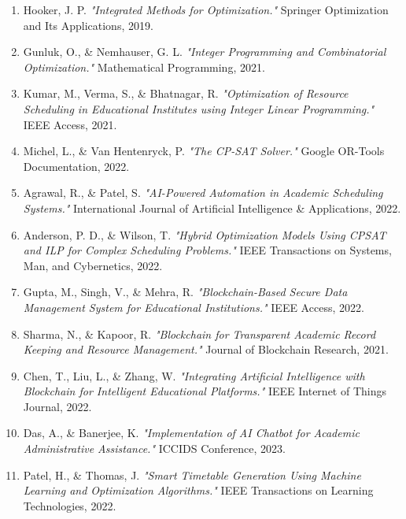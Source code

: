 \documentclass[a4paper, 12pt]{report}
\begin{document}
\begin{enumerate}
\renewcommand{\labelenumi}{[\arabic{enumi}]}

    \item Hooker, J. P. \textit{"Integrated Methods for Optimization."} Springer Optimization and Its Applications, 2019.
    
    \item Gunluk, O., \& Nemhauser, G. L. \textit{"Integer Programming and Combinatorial Optimization."} Mathematical Programming, 2021.
    
    \item Kumar, M., Verma, S., \& Bhatnagar, R. \textit{"Optimization of Resource Scheduling in Educational Institutes using Integer Linear Programming."} IEEE Access, 2021.
    
    \item Michel, L., \& Van Hentenryck, P. \textit{"The CP-SAT Solver."} Google OR-Tools Documentation, 2022.
    
    \item Agrawal, R., \& Patel, S. \textit{"AI-Powered Automation in Academic Scheduling Systems."} International Journal of Artificial Intelligence \& Applications, 2022.
    
    \item Anderson, P. D., \& Wilson, T. \textit{"Hybrid Optimization Models Using CPSAT and ILP for Complex Scheduling Problems."} IEEE Transactions on Systems, Man, and Cybernetics, 2022.
    
    \item Gupta, M., Singh, V., \& Mehra, R. \textit{"Blockchain-Based Secure Data Management System for Educational Institutions."} IEEE Access, 2022.
    
    \item Sharma, N., \& Kapoor, R. \textit{"Blockchain for Transparent Academic Record Keeping and Resource Management."} Journal of Blockchain Research, 2021.
    
    \item Chen, T., Liu, L., \& Zhang, W. \textit{"Integrating Artificial Intelligence with Blockchain for Intelligent Educational Platforms."} IEEE Internet of Things Journal, 2022.
    
    \item Das, A., \& Banerjee, K. \textit{"Implementation of AI Chatbot for Academic Administrative Assistance."} ICCIDS Conference, 2023.
    
    \item Patel, H., \& Thomas, J. \textit{"Smart Timetable Generation Using Machine Learning and Optimization Algorithms."} IEEE Transactions on Learning Technologies, 2022.
    

\end{enumerate}
\end{document}

